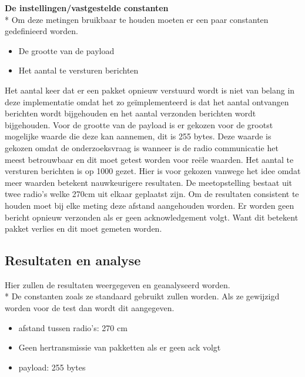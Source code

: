 \documentclass{article}
\begin{document}
\textbf{De instellingen/vastgestelde constanten}\\*
\setlength{\parskip}{10pt plus 1pt minus 1pt}
Om deze metingen bruikbaar te houden moeten er een paar constanten gedefinieerd worden.
\begin{itemize}
	\item De grootte van de payload
	\item Het aantal te versturen berichten
\end{itemize}
Het aantal keer dat er een pakket opnieuw verstuurd wordt is niet van belang in deze implementatie omdat het zo ge\"{i}mplementeerd is dat het aantal ontvangen berichten wordt bijgehouden en het aantal verzonden berichten wordt bijgehouden. 
Voor de grootte van de payload is er gekozen voor de grootst mogelijke waarde die deze kan aannemen, dit is 255 bytes. Deze waarde is gekozen omdat de onderzoeksvraag is wanneer is de radio communicatie het meest betrouwbaar en dit moet getest worden voor re\"{e}le waarden. 
Het aantal te versturen berichten is op 1000 gezet. Hier is voor gekozen vanwege het idee omdat meer waarden betekent nauwkeurigere resultaten.
\newline
\newline
De meetopstelling bestaat uit twee radio's welke 270cm uit elkaar geplaatst zijn. Om de resultaten consistent te houden moet bij elke meting deze afstand aangehouden worden. 
Er worden geen bericht opnieuw verzonden als er geen acknowledgement volgt. Want dit betekent pakket verlies en dit moet gemeten worden. 

\subsection{Resultaten en analyse}
Hier zullen de resultaten weergegeven en geanalyseerd worden. \\*
  De constanten zoals ze standaard gebruikt zullen worden. Als ze gewijzigd worden voor de test dan wordt dit aangegeven. 
  \begin{itemize}
  	\item afstand tussen radio's: 270 cm
  	\item Geen hertransmissie van pakketten als er geen ack volgt
  	\item payload: 255 bytes
  \end{itemize}
  
\end{document}
